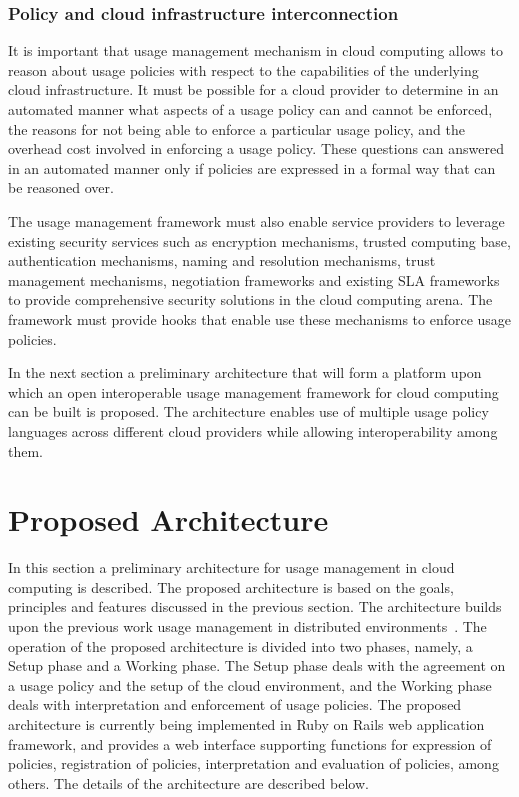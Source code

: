 \documentclass[10pt, conference, compsocconf]{IEEEtran}
\begin{document}
\subsubsection{Policy and cloud infrastructure interconnection}
It is important that usage management mechanism in cloud computing allows to reason about usage policies with respect to the capabilities of the underlying cloud infrastructure. It must be possible for a cloud provider to determine in an automated manner what aspects of a usage policy can and cannot be enforced, the reasons for not being able to enforce a particular usage policy, and the overhead cost involved in enforcing a usage policy. These questions can answered in an automated manner only if policies are expressed in a formal way that can be reasoned over. 

The usage management framework must also enable service providers to leverage existing security services such as encryption mechanisms, trusted computing base, authentication mechanisms, naming and resolution mechanisms, trust management mechanisms, negotiation frameworks and existing SLA frameworks to provide comprehensive security solutions in the cloud computing arena. The framework must provide hooks that enable use these mechanisms to enforce usage policies. 

In the next section a preliminary architecture that will form a platform upon which an open interoperable usage management framework for cloud computing can be built is proposed. The architecture enables use of multiple usage policy languages across different cloud providers while allowing interoperability among them. 





\section{Proposed Architecture}\label{sec:architecture}
In this section a preliminary architecture for usage management in cloud computing is described. The proposed architecture is based on the goals, principles and features discussed in the previous section. The architecture builds upon the previous work usage management in distributed environments~\cite{JaHeLa:10}.  The operation of the proposed architecture is divided into two phases, namely, a Setup phase and a Working phase. The Setup phase deals with the agreement on a usage policy and the setup of the cloud environment, and the Working phase deals with interpretation and enforcement of usage policies. The proposed architecture is currently being implemented in Ruby on Rails web application framework, and provides a web interface supporting functions for expression of policies, registration of policies, interpretation and evaluation of policies, among others. The details of the architecture are described below.
\end{document}
